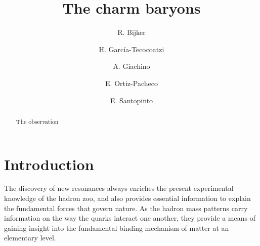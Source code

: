 \documentclass[twocolumn,superscriptaddress,preprintnumbers,nofootinbib]{revtex4}
\begin{document}




\title{The charm baryons}

\author{ R. Bijker} 

\author{H. Garc{\'i}a-Tecocoatzi}

\author{ A. Giachino} 

\author{E. Ortiz-Pacheco}


\author{E. Santopinto}




\begin{abstract}
The observation
\end{abstract}

\maketitle






\section{Introduction}
The discovery of new resonances always enriches the present experimental knowledge of the hadron zoo, and also provides essential information to explain the fundamental forces that govern nature. 
As the hadron mass patterns carry information on the way the quarks interact one another, they provide a means of gaining insight into the fundamental binding mechanism of matter at an elementary level.
\end{document}
